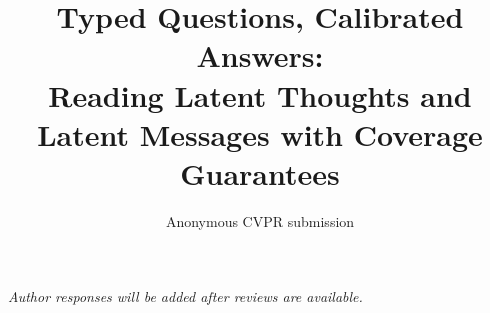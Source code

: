 \documentclass[10pt,twocolumn,letterpaper]{article}
\title{Typed Questions, Calibrated Answers:\\Reading Latent Thoughts and Latent Messages with Coverage Guarantees}
\author{Anonymous CVPR submission}
\begin{document}
\maketitle
\thispagestyle{empty}
\appendix

\noindent\textit{Author responses will be added after reviews are available.}

% 
% 
\end{document}
